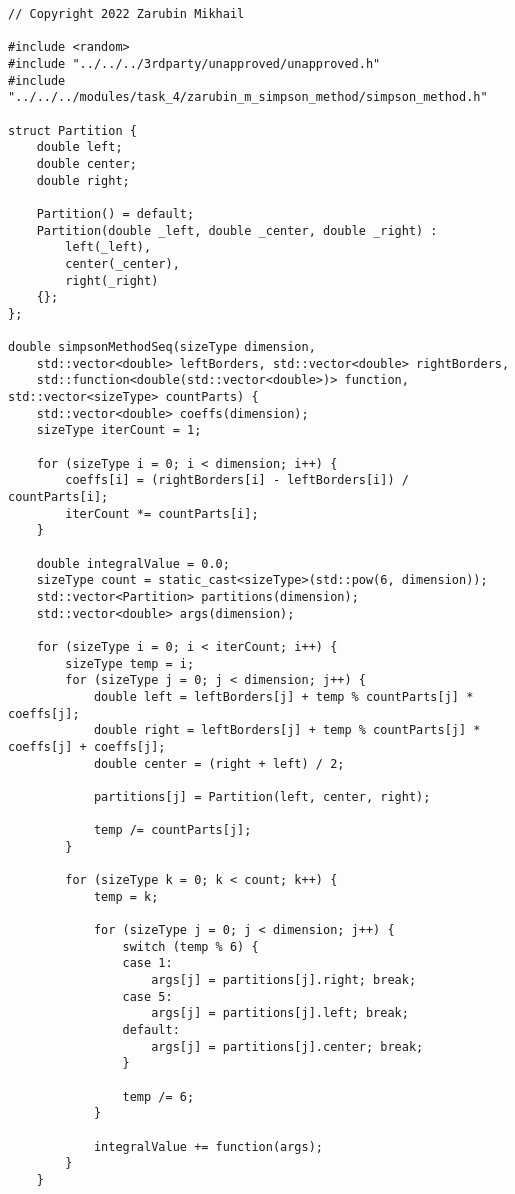 \documentclass{report}
\begin{document}
\begin{lstlisting}
// Copyright 2022 Zarubin Mikhail

#include <random>
#include "../../../3rdparty/unapproved/unapproved.h"
#include "../../../modules/task_4/zarubin_m_simpson_method/simpson_method.h"

struct Partition {
    double left;
    double center;
    double right;

    Partition() = default;
    Partition(double _left, double _center, double _right) :
        left(_left),
        center(_center),
        right(_right)
    {};
};

double simpsonMethodSeq(sizeType dimension,
    std::vector<double> leftBorders, std::vector<double> rightBorders,
    std::function<double(std::vector<double>)> function, std::vector<sizeType> countParts) {
    std::vector<double> coeffs(dimension);
    sizeType iterCount = 1;

    for (sizeType i = 0; i < dimension; i++) {
        coeffs[i] = (rightBorders[i] - leftBorders[i]) / countParts[i];
        iterCount *= countParts[i];
    }

    double integralValue = 0.0;
    sizeType count = static_cast<sizeType>(std::pow(6, dimension));
    std::vector<Partition> partitions(dimension);
    std::vector<double> args(dimension);

    for (sizeType i = 0; i < iterCount; i++) {
        sizeType temp = i;
        for (sizeType j = 0; j < dimension; j++) {
            double left = leftBorders[j] + temp % countParts[j] * coeffs[j];
            double right = leftBorders[j] + temp % countParts[j] * coeffs[j] + coeffs[j];
            double center = (right + left) / 2;

            partitions[j] = Partition(left, center, right);

            temp /= countParts[j];
        }

        for (sizeType k = 0; k < count; k++) {
            temp = k;

            for (sizeType j = 0; j < dimension; j++) {
                switch (temp % 6) {
                case 1:
                    args[j] = partitions[j].right; break;
                case 5:
                    args[j] = partitions[j].left; break;
                default:
                    args[j] = partitions[j].center; break;
                }

                temp /= 6;
            }

            integralValue += function(args);
        }
    }


\end{lstlisting}
\end{document}
